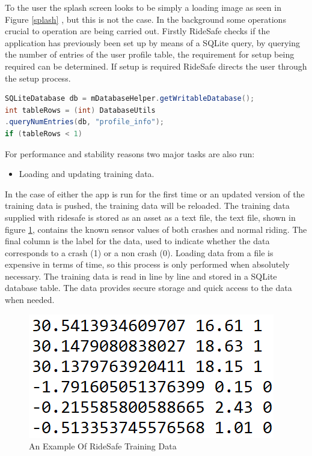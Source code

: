 To the user the splash screen looks to be simply a loading image as seen in Figure \ref{splash} , but this is not the case. In the background some operations crucial to operation are being carried out. Firstly RideSafe checks if the application has previously been set up by means of a SQLite query, by querying the number of entries of the user profile table, the requirement for setup being required can be determined. If setup is required RideSafe directs the user through the setup process.

\vspace{3cm}


\begin{lstlisting}[language=Java,basicstyle=\small, breaklines=true, label={lst:Code Snippet1},caption={Querying database entries}]
SQLiteDatabase db = mDatabaseHelper.getWritableDatabase();
int tableRows = (int) DatabaseUtils
.queryNumEntries(db, "profile_info");
if (tableRows < 1)
\end{lstlisting}






For performance and stability reasons two major tasks are also run: 



\begin{itemize}
\item{Loading and updating training data.}
\end{itemize}

In the case of either the app is run for the first time or an updated version of the training data is pushed, the training data will be reloaded. The training data supplied with ridesafe is stored as an asset as a text file, the text file, shown in figure \ref{std}, contains the known sensor values of both crashes and normal riding. The final column is the label for the data, used to indicate whether the data corresponds to a crash (1) or a non crash (0). Loading data from a file is expensive in terms of time, so this process is only performed when absolutely necessary. The training data is read in line by line and stored in a SQLite database table. The data provides secure storage and quick access to the data when needed.


\begin{figure}[h]
      \centering
      \includegraphics[scale = 1]{implementation/std.png}
      \caption{An Example Of RideSafe Training Data}
      \label{std}
\end{figure}

